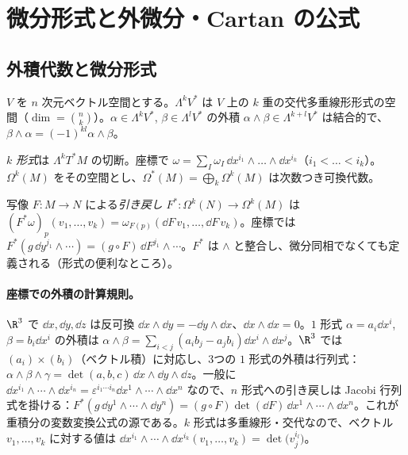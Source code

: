
\section{微分形式と外微分・Cartan の公式}
\subsection{外積代数と微分形式}
$V$ を $n$ 次元ベクトル空間とする。$\Lambda^kV^*$ は $V$ 上の $k$ 重の交代多重線形形式の空間（$\dim=\binom nk$）。$\alpha\in\Lambda^kV^*$, $\beta\in\Lambda^lV^*$ の外積 $\alpha\wedge\beta\in\Lambda^{k+l}V^*$ は結合的で、$\beta\wedge\alpha=(-1)^{kl}\alpha\wedge\beta$。

\begin{defn}
\emph{$k$ 形式}は $\Lambda^kT^*M$ の切断。座標で $\omega=\sum_{I}\omega_I\,\dd x^{i_1}\wedge\dots\wedge\dd x^{i_k}$（$i_1<\dots<i_k$）。$\Omega^k(M)$ をその空間とし、$\Omega^*(M)=\bigoplus_k\Omega^k(M)$ は次数つき可換代数。
\end{defn}

写像 $F:M\to N$ による\emph{引き戻し} $F^*:\Omega^k(N)\to\Omega^k(M)$ は $(F^*\omega)_p(v_1,\dots,v_k)=\omega_{F(p)}(\dd F\,v_1,\dots,\dd F\,v_k)$。座標では $F^*(g\,\dd y^{j_1}\wedge\cdots)=(g\circ F)\,\dd F^{j_1}\wedge\cdots$。$F^*$ は $\wedge$ と整合し、微分同相でなくても定義される（形式の便利なところ）。


\paragraph{座標での外積の計算規則。}$\R^3$ で $\dd x,\dd y,\dd z$ は反可換 $\dd x\wedge\dd y=-\dd y\wedge\dd x$、$\dd x\wedge\dd x=0$。$1$ 形式 $\alpha=a_i\dd x^i$, $\beta=b_i\dd x^i$ の外積は $\alpha\wedge\beta=\sum_{i<j}(a_ib_j-a_jb_i)\dd x^i\wedge\dd x^j$。$\R^3$ では $(a_i)\times(b_i)$（ベクトル積）に対応し、3つの $1$ 形式の外積は行列式：$\alpha\wedge\beta\wedge\gamma=\det(a,b,c)\,\dd x\wedge\dd y\wedge\dd z$。一般に $\dd x^{i_1}\wedge\cdots\wedge\dd x^{i_n}=\varepsilon^{i_1\cdots i_n}\dd x^1\wedge\cdots\wedge\dd x^n$ なので、$n$ 形式への引き戻しは Jacobi 行列式を掛ける：$F^*(g\,\dd y^1\wedge\cdots\wedge\dd y^n)=(g\circ F)\det(\dd F)\,\dd x^1\wedge\cdots\wedge\dd x^n$。これが重積分の変数変換公式の源である。$k$ 形式は多重線形・交代なので、ベクトル $v_1,\dots,v_k$ に対する値は $\dd x^{i_1}\wedge\cdots\wedge\dd x^{i_k}(v_1,\dots,v_k)=\det\bigl(v_j^{i_l}\bigr)$。

